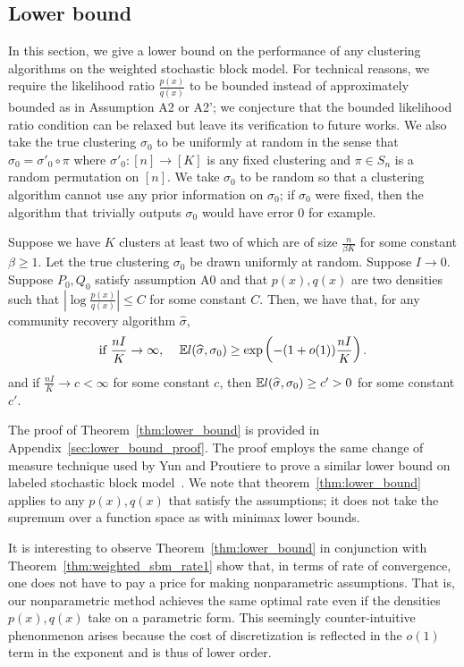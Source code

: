 \documentclass{article}
\begin{document}

\subsection{Lower bound}


In this section, we give a lower bound on the performance of any clustering algorithms on the weighted stochastic block model. For technical reasons, we require the likelihood ratio $\frac{p(x)}{q(x)}$ to be bounded instead of approximately bounded as in Assumption A2 or A2'; we conjecture that the bounded likelihood ratio condition can be relaxed but leave its verification to future works. We also take the true clustering $\sigma_0$ to be uniformly at random in the sense that $\sigma_0 = \sigma'_0 \circ \pi$ where $\sigma'_0 : [n] \rightarrow [K]$ is any fixed clustering and $\pi \in S_n$ is a random permutation on $[n]$. We take $\sigma_0$ to be random so that a clustering algorithm cannot use any prior information on $\sigma_0$; if $\sigma_0$ were fixed, then the algorithm that trivially outputs $\sigma_0$ would have error 0 for example.


\begin{theorem}
\label{thm:lower_bound}
Suppose we have $K$ clusters at least two of which are of size $\frac{n}{\beta K}$ for some constant $\beta \geq 1$. Let the true clustering $\sigma_0$ be drawn uniformly at random. Suppose $I \rightarrow 0$. Suppose $P_0, Q_0$ satisfy assumption A0 and that $p(x), q(x)$ are two densities such that $\left| \log \frac{p(x)}{q(x)} \right| \leq C$ for some constant $C$. Then, we have that, for any community recovery algorithm $\hat{\sigma}$, 
\[
\textrm{if $\frac{nI}{K} \rightarrow \infty$, } \quad {\mathbb E} l(\widehat{\sigma}, \sigma_0) \geq \exp \left( - (1 + o(1)) \frac{ n I}{K} \right).
\]
and if $\frac{nI}{K} \rightarrow c < \infty$ for some constant $c$, then ${\mathbb E}  l(\widehat{\sigma}, \sigma_0) \geq c' > 0$ for some constant $c'$. 
\end{theorem}

The proof of Theorem~\ref{thm:lower_bound} is provided in Appendix~\ref{sec:lower_bound_proof}. The proof employs the same change of measure technique used by Yun and Proutiere to prove a similar lower bound on labeled stochastic block model~\cite{yun2016optimal}. We note that theorem~\ref{thm:lower_bound} applies to any $p(x), q(x)$ that satisfy the assumptions; it does not take the supremum over a function space as with minimax lower bounds. 

It is interesting to observe Theorem~\ref{thm:lower_bound} in conjunction with Theorem~\ref{thm:weighted_sbm_rate1} show that, in terms of rate of convergence, one does not have to pay a price for making nonparametric assumptions. That is, our nonparametric method achieves the same optimal rate even if the densities $p(x), q(x)$ take on a parametric form. This seemingly counter-intuitive phenonmenon arises because the cost of discretization is reflected in the $o(1)$ term in the exponent and is thus of lower order. 
\end{document}
